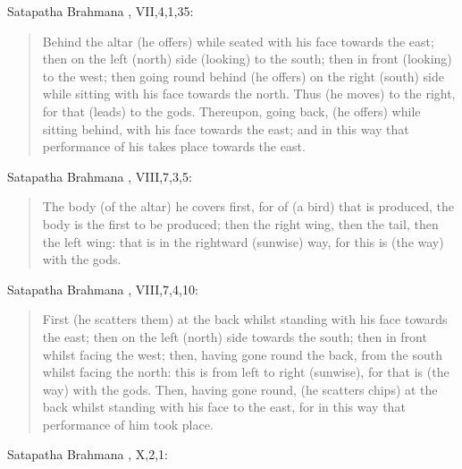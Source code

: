 \documentclass{article}
\begin{document}
Satapatha Brahmana \cite[pp.~372--373]{eggelingIII}, VII,4,1,35:

\begin{quote}
Behind the altar (he offers) while seated with
his face towards the east; then on the left (north) 
side (looking) to the south; then in front (looking) to the west;
then going round behind (he offers) on
the right (south) side while sitting with his face towards the north. Thus (he moves)
to the right, for that (leads) to the gods. Thereupon, going back, (he offers) while sitting behind,
with his face towards the east; and in this way that performance of his takes place towards the east.
\end{quote}

Satapatha Brahmana \cite[p.~139]{eggelingIV}, VIII,7,3,5:

\begin{quote}
The body (of the altar) he covers first, for of (a bird) that is produced,
the body is the first to be produced; then the right wing, then the tail, then
the left wing: that is in the rightward (sunwise) way, for this is (the way) with the gods.
\end{quote}

Satapatha Brahmana \cite[p.~147]{eggelingIV}, VIII,7,4,10:

\begin{quote}
First (he scatters them) at the back whilst
standing with his face towards the east; then on
the left (north) side towards the south; then in
front whilst facing the west; then, having gone
round the back, from the south whilst facing the
north: this is from left to right (sunwise), for that
is (the way) with the gods. Then, having gone
round, (he scatters chips) at the back whilst 
standing with his face to the east, for in this way
that performance of him took place.
\end{quote}

Satapatha Brahmana \cite[pp.~299--300]{eggelingIV}, X,2,1:
\end{document}
